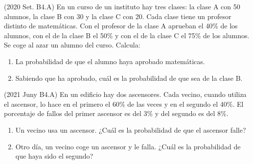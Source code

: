 
\item (2020 Set. B4.A) En un curso de un instituto hay tres clases: la clase A con 50 alumnos, la clase B con 30 y la clase C con 20. Cada clase tiene un profesor distinto de matemáticas. Con el profesor de la clase A aprueban el 40\% de los alumnos, con el de la clase B el 50\% y con el de la clase C el 75\% de los alumnos. Se coge al azar un alumno del curso. Calcula:
\begin{enumerate}
 \item La probabilidad de que el alumno haya aprobado matemáticas.
 \item Sabiendo que ha aprobado, cuál es la probabilidad de que sea de la clase B.
\end{enumerate}


\item (2021 Juny B4.A) En un edificio hay dos ascensores. Cada vecino, cuando utiliza el ascensor, lo hace en el primero el 60\% de las veces y en el segundo el 40\%. El porcentaje de fallos del primer ascensor es del 3\% y del segundo es del 8\%.
\begin{enumerate}
 \item Un vecino usa un ascensor. ¿Cuál es la probabilidad de que el ascensor falle?
 \item Otro día, un vecino coge un ascensor y le falla. ¿Cuál es la probabilidad de que haya sido el
segundo?
\end{enumerate}


